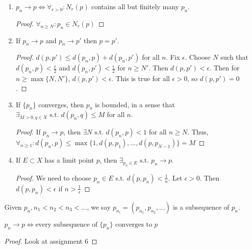 \begin{thm}[2]
	\begin{enumerate}[label=(\alph*)]
		\item $p_n\to p \Leftrightarrow \forall_{r >0}: N_r(p)$ contains all but finitely many $p_n$.
		      \begin{proof}
			      $\forall_{n \ge N}: p_n \in N_r(p)$
		      \end{proof}
		\item If $p_n\to p$ and $p_n \to p'$ then $p=p'$.
		      \begin{proof}
			      $d(p,p')\le d(p_n,p)+d(p_n,p')$ for all $n$.
			      Fix $\epsilon$. Choose $N$ such that $d(p_n,p)<\frac{\epsilon}{2}$ and $d(p_n,p')<\frac{\epsilon}{2}$ for $n\ge N'$. Then $d(p,p')< \epsilon$.
			      Then for $n\ge \max\{N,N'\}$, $d(p,p')< \epsilon$. This is true for all $\epsilon>0$, so $d(p,p')=0$.
		      \end{proof}
		\item If $\{p_n\}$ converges, then ${p}_{n} $ is bounded, in a sense that $\exists_{M>0,q \in X} \text{ s.t. } d(p_n,q)\le M$ for all $n$.
		      \begin{proof}
			      If $p_n \to p$, then $\exists N \text{ s.t. } d(p_n,p)<1 $ for all $n\ge N$. Thus, $\forall_{n \ge 1}: d(p_n,p)\le \max\{1,d(p,p_1),\ldots ,d(p,p_{N-1})\}=M$
		      \end{proof}
		\item If $E \subset X$ has a limit point $p$, then $\exists_{{p}_{n} \in E} \text{ s.t. } p_n \to p$.
		      \begin{proof}
			      We need to choose $p_n \in E$ s.t. $d(p,p_n)<\frac{1}{n}$.
			      Let $\epsilon>0$. Then $d(p,p_n)<\epsilon$ if $n>\frac{1}{\epsilon}$
		      \end{proof}
	\end{enumerate}
\end{thm}

\begin{definition}
	\label{def:3.5}
	Given ${p}_{n}, n_1<n_2<n_3<\ldots $, we say ${p}_{n_i}=(p_{n_1},p_{n_2},\ldots )$ is a subsequence of ${p}_{n}$.
\end{definition}

\begin{lemma}
	$p_n\to p \Leftrightarrow \text{every subsequence of $\{p_n\}$ converges to $p$} $

	\begin{proof}
		Look at assignment 6
	\end{proof}
\end{lemma}


